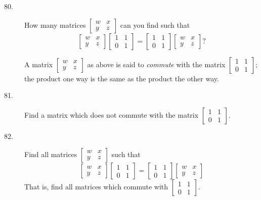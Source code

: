 \documentclass{article}
\begin{document}
\begin{description}

  \item[80.] How many matrices $\begin{bmatrix} w & x \\ y & z \end{bmatrix}$ can you find such that
    \begin{equation*}
    \begin{bmatrix} w & x \\ y & z \end{bmatrix} \begin{bmatrix} 1 & 1 \\ 0 & 1 \end{bmatrix}
    = \begin{bmatrix} 1 & 1 \\ 0 & 1 \end{bmatrix} \begin{bmatrix} w & x \\ y & z \end{bmatrix} ?
    \end{equation*}

  \item[] A matrix $\begin{bmatrix} w & x \\ y & z \end{bmatrix}$ as above is said to \emph{commute} with the matrix $\begin{bmatrix} 1 & 1 \\ 0 & 1 \end{bmatrix}$; the product one way is the same as the product the other way.

  \item[81.] Find a matrix which does not commute with the matrix $\begin{bmatrix} 1 & 1 \\ 0 & 1 \end{bmatrix}$.

  \item[82.] Find all matrices $\begin{bmatrix} w & x \\ y & z \end{bmatrix}$ such that
    \begin{equation*}
    \begin{bmatrix} w & x \\ y & z \end{bmatrix} \begin{bmatrix} 1 & 1 \\ 0 & 1 \end{bmatrix}
    = \begin{bmatrix} 1 & 1 \\ 0 & 1 \end{bmatrix} \begin{bmatrix} w & x \\ y & z \end{bmatrix}
    \end{equation*}
    That is, find all matrices which commute with $\begin{bmatrix} 1 & 1 \\ 0 & 1 \end{bmatrix}$.


\end{description}
\end{document}

